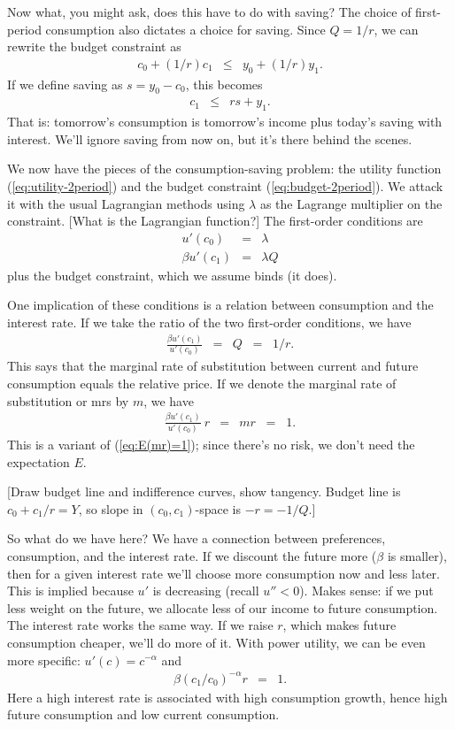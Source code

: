 \documentclass[11pt]{article}
\begin{document}
Now what, you might ask, does this have to do with saving?
The choice of first-period consumption also dictates a choice for saving.
Since $Q = 1/r$, we can rewrite the budget constraint as
\begin{eqnarray*}
    c_0 + (1/r) c_1 &\leq& y_0 + (1/r) y_1 .
\end{eqnarray*}
If we define saving as $s = y_0 - c_0$,
this becomes
\begin{eqnarray*}
    c_1  &\leq& r s +  y_1 .
\end{eqnarray*}
That is:  tomorrow's consumption is tomorrow's income
plus today's saving with interest.
We'll ignore saving from now on, but it's there behind the scenes.

We now have the pieces of the consumption-saving problem:
the utility function (\ref{eq:utility-2period})
and the budget constraint (\ref{eq:budget-2period}).
We attack it with the usual Lagrangian methods
using $\lambda$ as the Lagrange multiplier on the constraint.
[What is the Lagrangian function?]
The first-order conditions are
\begin{eqnarray*}
        u'(c_0)  &=& \lambda  \\
       \beta u'(c_1)  &=& \lambda Q
\end{eqnarray*}
plus the budget constraint, which we assume binds (it does).

One implication of these conditions is a relation
between consumption and the interest rate.
If we take the ratio of the two first-order conditions,
we have
\begin{eqnarray*}
       \frac {\beta u'(c_1)}{u'(c_0)}  &=& Q \;\;=\;\; 1/r.
\end{eqnarray*}
This says that the marginal rate of substitution
between current and future consumption equals
the relative price.
If we denote the marginal rate of substitution or mrs by $m$, we have
\begin{eqnarray}
       \frac{\beta u'(c_1)}{u'(c_0)} \ r  &=& m r \;\;=\;\;  1 .
       \label{eq:euler-deterministic}
\end{eqnarray}
This is a variant of (\ref{eq:E(mr)=1});
since there's no risk, we don't need the expectation $E$.

[Draw budget line and indifference curves, show tangency.
Budget line is $c_0 + c_1/r = Y$, so slope in $(c_0,c_1)$-space
is $-r = - 1/Q$.]

So what do we have here?  We have a connection between
preferences, consumption, and the interest rate.
If we discount the future more ($\beta$ is smaller),
then for a given interest rate we'll choose
more consumption now and less later.
This is implied because $u'$ is decreasing (recall $u''<0$).
Makes sense:  if we put less weight on the future,
we allocate less of our income to future consumption.
The interest rate works the same way.
If we raise $r$, which makes future consumption cheaper,
we'll do more of it.
With power utility, we can be even more specific:
$u'(c) = c^{-\alpha}$ and
\begin{eqnarray*}
       \beta (c_1/c_0)^{-\alpha}  r  &=& 1 .
\end{eqnarray*}
Here a high interest rate is associated with
high consumption growth,
hence high future consumption and low current consumption.
\end{document}

